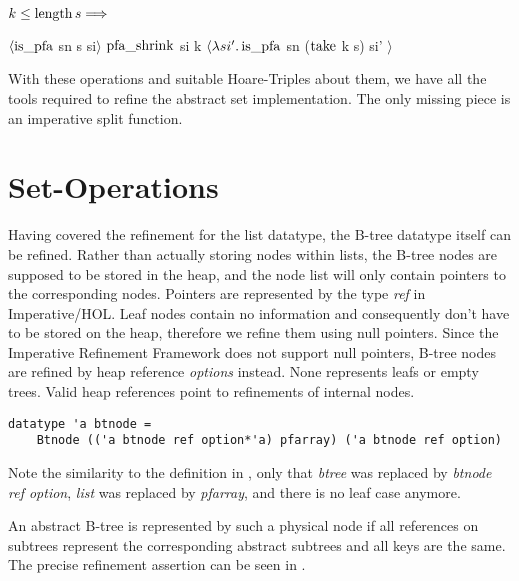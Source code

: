 \begin{lemma}
    $k \le \operatorname{length} s\Longrightarrow$ \\
    \begin{center}
    $\langle \operatorname{is\_pfa}$ sn s si$\rangle$
    $\operatorname{pfa\_shrink}$ si k
    $\langle\lambda si'. \operatorname{is\_pfa}$ sn ($\operatorname{take}$ k s) si' $\rangle$
    \end{center}
\end{lemma}

With these operations and suitable Hoare-Triples about them,
we have all the tools required to refine the abstract set implementation.
The only missing piece is an imperative split function.

\section{Set-Operations}

Having covered the refinement for the list datatype,
the B-tree datatype itself can be refined.
Rather than actually storing nodes within lists,
the B-tree nodes are supposed to be stored in the heap,
and the node list will only contain pointers to the corresponding nodes.
Pointers are represented by the type \textit{ref} in Imperative/HOL.
Leaf nodes contain no information and consequently don't have to be stored
on the heap, therefore we refine them using null pointers.
Since the Imperative Refinement Framework does not support null pointers,
B-tree nodes are refined by heap reference \textit{options} instead.
None represents leafs or empty trees.
Valid heap references point to refinements of internal nodes.

\begin{lstlisting}[mathescape=true, language=Isabelle]
datatype 'a btnode =
    Btnode (('a btnode ref option*'a) pfarray) ('a btnode ref option)
\end{lstlisting}

Note the similarity to the definition in ,
only that \textit{btree} was replaced by \textit{btnode ref option},
\textit{list} was replaced by \textit{pfarray},
and there is no leaf case anymore.

An abstract B-tree is represented by such a physical node
if all references on subtrees represent the corresponding
abstract subtrees and all keys are the same.
The precise refinement assertion can be seen in .

